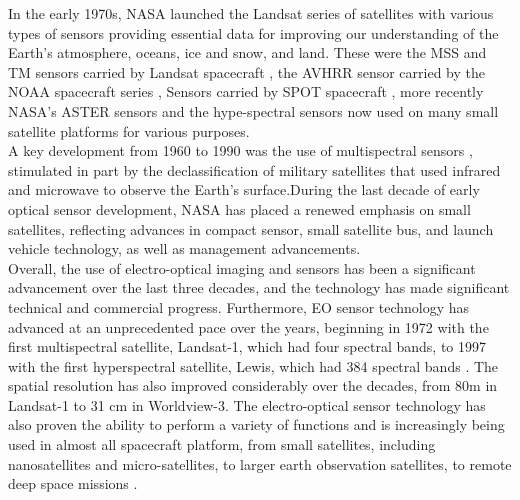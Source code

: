 \documentclass[final,5p,times,twocolumn]{elsarticle}
\begin{document}
In the early 1970s, NASA launched the Landsat series of satellites with various types of sensors providing essential data for improving our understanding of the Earth's atmosphere, oceans, ice and snow, and land. These were the MSS and TM sensors carried by Landsat spacecraft \citep{wulder2019current}, the AVHRR sensor carried by the NOAA spacecraft series \citep{oesterheld1998relation}, Sensors carried by SPOT spacecraft \citep{Tatem2008FiftyYO}, more recently NASA's ASTER sensors and the hype-spectral sensors \citep{prentice2021design} now used on many small satellite platforms for various purposes. \\
A key development from 1960 to 1990 was the use of multispectral sensors \citep{Tatem2008FiftyYO}, stimulated in part by the declassification of military satellites that used infrared and microwave to observe the Earth's surface.During the last decade of early optical sensor development, NASA has placed a renewed emphasis on small satellites, reflecting advances in compact sensor, small satellite bus, and launch vehicle technology, as well as management advancements.\\
Overall, the use of electro-optical imaging and sensors has been a significant advancement over the last three decades, and the technology has made significant technical and commercial progress. Furthermore, EO sensor technology has advanced at an unprecedented pace over the years, beginning in 1972 with the first multispectral satellite, Landsat-1, which had four spectral bands, to 1997 with the first hyperspectral satellite, Lewis, which had 384 spectral bands \citep{zhu2018review}. The spatial resolution has also improved considerably over the decades, from 80m in Landsat-1 to 31 cm in Worldview-3.  The electro-optical sensor technology has also proven the ability to perform a variety of functions and is increasingly being used in almost all spacecraft platform, from small satellites, including nanosatellites and micro-satellites, to larger earth observation satellites, to remote deep space missions \citep{chauhan2015hyperspectral}. 
\end{document}
